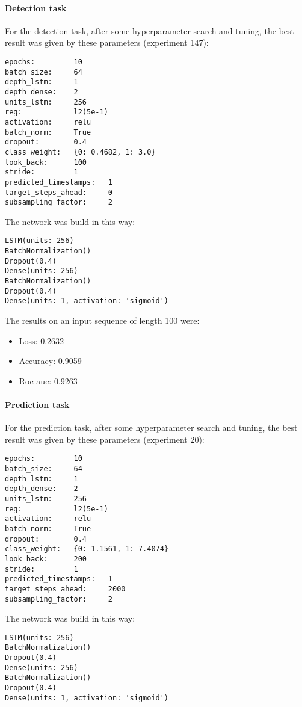 \paragraph{Detection task} For the detection task, after some hyperparameter search and tuning, the best result was given by these parameters (experiment 147):
\begin{lstlisting}
epochs:			10
batch_size:		64
depth_lstm:		1
depth_dense:	2
units_lstm:		256
reg:            l2(5e-1)
activation:		relu
batch_norm:		True
dropout:        0.4
class_weight:	{0: 0.4682, 1: 3.0}
look_back:		100
stride:			1
predicted_timestamps:	1
target_steps_ahead:		0
subsampling_factor:		2
\end{lstlisting}

The network was build in this way:

\begin{lstlisting}
LSTM(units: 256)
BatchNormalization()
Dropout(0.4)
Dense(units: 256)
BatchNormalization()
Dropout(0.4)
Dense(units: 1, activation: 'sigmoid')
\end{lstlisting}

The results on an input sequence of length 100 were:

\begin{itemize}
    \item Loss: 0.2632
    \item Accuracy: 0.9059
    \item Roc auc: 0.9263
\end{itemize}

\paragraph{Prediction task} For the prediction task, after some hyperparameter search and tuning, the best result was given by these parameters (experiment 20):
\begin{lstlisting}
epochs:			10
batch_size:		64
depth_lstm:		1
depth_dense:	2
units_lstm:		256
reg:            l2(5e-1)
activation:		relu
batch_norm:		True
dropout:        0.4
class_weight:	{0: 1.1561, 1: 7.4074}
look_back:		200
stride:			1
predicted_timestamps:	1
target_steps_ahead:		2000
subsampling_factor:		2
\end{lstlisting}

The network was build in this way:

\begin{lstlisting}
LSTM(units: 256)
BatchNormalization()
Dropout(0.4)
Dense(units: 256)
BatchNormalization()
Dropout(0.4)
Dense(units: 1, activation: 'sigmoid')
\end{lstlisting}

